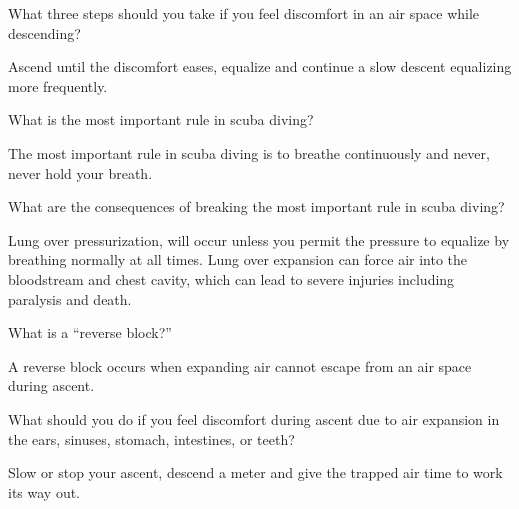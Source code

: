	\begin{qanda}
		\begin{question}
What three steps should you take if you feel discomfort in an air space while descending?
		\end{question}

		\begin{answer}
Ascend until the discomfort eases, equalize and continue a slow descent equalizing more frequently.
		\end{answer}
	\end{qanda}

	\begin{qanda}
		\begin{question}
What is the most important rule in scuba diving?
		\end{question}

		\begin{answer}
The most important rule in scuba diving is to breathe continuously and never, never hold your breath.
		\end{answer}
	\end{qanda}

	\begin{qanda}
		\begin{question}
What are the consequences of breaking the most important rule in scuba diving?
		\end{question}

		\begin{answer}
Lung over pressurization, will occur unless you permit the pressure to equalize by breathing normally at all times.  Lung over expansion can force air into the bloodstream and chest cavity, which can lead to severe injuries including paralysis and death.
		\end{answer}
	\end{qanda}

	\begin{qanda}
		\begin{question}
What is a ``reverse block?''
		\end{question}

		\begin{answer}
A reverse block occurs when expanding air cannot escape from an air space during ascent.%
		\end{answer}
	\end{qanda}

	\begin{qanda}
		\begin{question}
What should you do if you feel discomfort during ascent due to air expansion in the ears, sinuses, stomach, intestines, or teeth?
		\end{question}

		\begin{answer}
Slow or stop your ascent, descend a meter and give the trapped air time to work its way out.
		\end{answer}
	\end{qanda}


